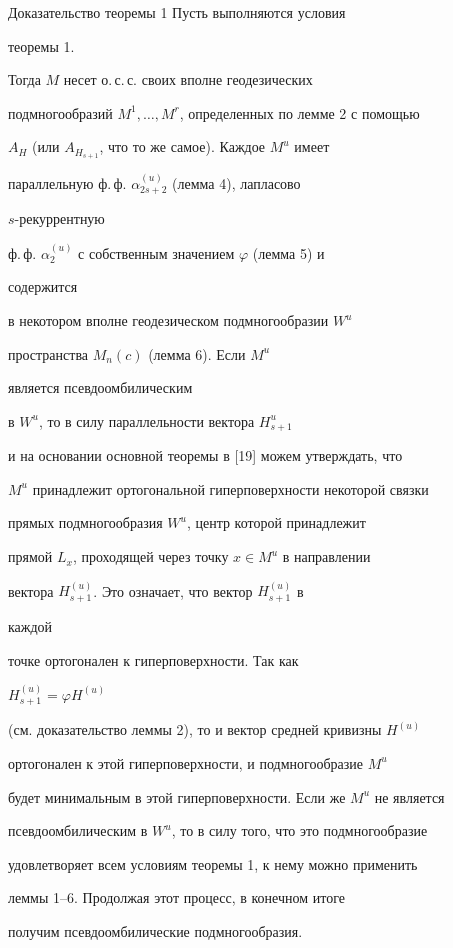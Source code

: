 \begin{pf*}{Доказательство теоремы 1} Пусть выполняются условия


теоремы 1.


Тогда $M$ несет о.\,с.\,с. своих вполне геодезических


подмногообразий $M^1,\dotsc,M^r$, определенных по лемме 2 с помощью


$A_H$ (или $A_{H_{s+1}}$, что то же самое). Каждое $M^u$ имеет


параллельную ф.\,ф. $\alpha^{(u)}_{2s+2}$ (лемма 4), лапласово


$s$-рекуррентную


ф.\,ф. $\alpha^{(u)}_2$ с собственным значением $\varphi$ (лемма 5) и


содержится


в некотором вполне геодезическом подмногообразии $W^u$


пространства $M_n(c)$ (лемма 6). Если $M^u$


является псевдоомбилическим


в $W^u$, то в силу параллельности вектора $H^u_{s+1}$


и на основании основной теоремы в [19] можем утверждать, что


$M^u$ принадлежит ортогональной гиперповерхности некоторой связки


прямых подмногообразия $W^u$, центр которой принадлежит


прямой $L_x$, проходящей через точку $x\in M^u$ в направлении


вектора $H^{(u)}_{s+1}$. Это означает, что вектор $H^{(u)}_{s+1}$ в


каждой


точке ортогонален к гиперповерхности. Так как


$H^{(u)}_{s+1}=\varphi H^{(u)}$


(см. доказательство леммы 2), то и вектор средней кривизны $H^{(u)}$


ортогонален к этой гиперповерхности, и подмногообразие $M^u$


будет минимальным в этой гиперповерхности. Если же $M^u$ не является


псевдоомбилическим в $W^u$, то в силу того, что это подмногообразие


удовлетворяет всем условиям теоремы 1, к нему можно применить


леммы 1--6. Продолжая этот процесс, в конечном итоге


получим псевдоомбилические подмногообразия.


\end{pf*}






